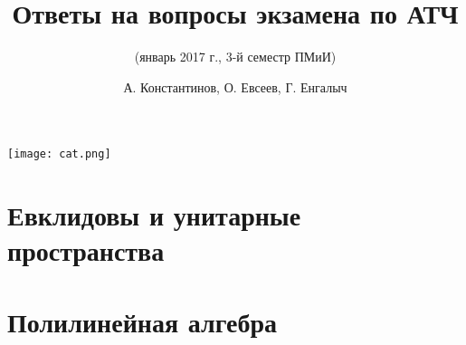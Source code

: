\documentclass{scrartcl}
\title{Ответы на вопросы экзамена по АТЧ}
\subtitle{(январь 2017 г., 3-й семестр ПМиИ)}
\author{А. Константинов, О. Евсеев, Г. Енгалыч}
\begin{document}
    \thispagestyle{empty}
    \maketitle
    
    \begin{center}
        \vspace{120pt}
        \texttt{[image: cat.png]}
    \end{center}    

    \setcounter{part}{8}
    
    \part{Евклидовы и унитарные пространства}
    
    
    \setcounter{section}{13}
    
    
    \setcounter{section}{27}
        
    \part{Полилинейная алгебра}
\end{document}
